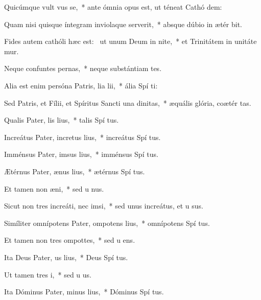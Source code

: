 \item Quicúmque vult vus se,~* ante ómnia opus est, ut téneat Cathó dem:
\item Quam nisi quisque íntegram inviolaque serverit,~* absque dúbio in ætér bit.
\item Fides autem cathóli hæc est:~\pscross{} ut unum Deum in nite,~* et Trinitátem in unitáte mur.
\item Neque confuntes pernas,~* neque substántiam tes.
\item Alia est enim persóna Patris, lia lii,~* ália Spí ti:
\item Sed Patris, et Fílii, et Spíritus Sancti una  dinitas,~* æquális glória, coætér tas.
\item Qualis Pater, lis lius,~* talis Spí tus.
\item Increátus Pater, incretus lius,~* increátus Spí tus.
\item Imménsus Pater, imsus lius,~* imménsus Spí tus.
\item Ætérnus Pater, ænus lius,~* ætérnus Spí tus.
\item Et tamen non  æni,~* sed u nus.
\item Sicut non tres increáti, nec  imsi,~* sed unus increátus, et u sus.
\item Simíliter omnípotens Pater, ompotens lius,~* omnípotens Spí tus.
\item Et tamen non tres ompottes,~* sed u ens.
\item Ita Deus Pater, us lius,~* Deus Spí tus.
\item Ut tamen  tres i,~* sed u  us.
\item Ita Dóminus Pater, minus lius,~* Dóminus Spí tus.
